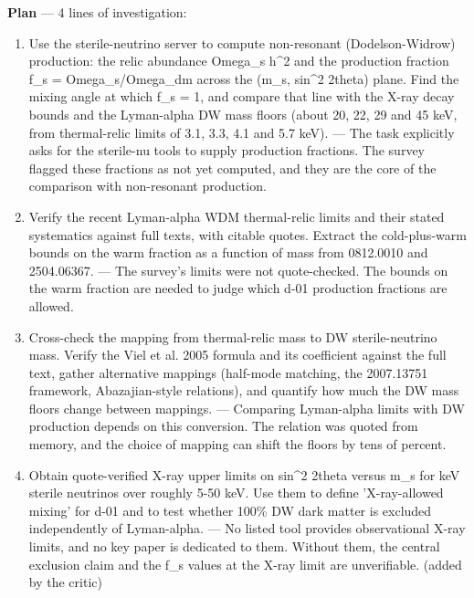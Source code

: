 \documentclass[11pt,a4paper]{article}
\begin{document}
\textbf{Plan} --- 4 lines of investigation:

\begin{enumerate}
  \item Use the sterile-neutrino server to compute non-resonant (Dodelson-Widrow) production: the relic abundance Omega\_s h\textasciicircum{}2 and the production fraction f\_s = Omega\_s/Omega\_dm across the (m\_s, sin\textasciicircum{}2 2theta) plane. Find the mixing angle at which f\_s = 1, and compare that line with the X-ray decay bounds and the Lyman-alpha DW mass floors (about 20, 22, 29 and 45 keV, from thermal-relic limits of 3.1, 3.3, 4.1 and 5.7 keV). --- The task explicitly asks for the sterile-nu tools to supply production fractions. The survey flagged these fractions as not yet computed, and they are the core of the comparison with non-resonant production.
  \item Verify the recent Lyman-alpha WDM thermal-relic limits and their stated systematics against full texts, with citable quotes. Extract the cold-plus-warm bounds on the warm fraction as a function of mass from 0812.0010 and 2504.06367. --- The survey's limits were not quote-checked. The bounds on the warm fraction are needed to judge which d-01 production fractions are allowed.
  \item Cross-check the mapping from thermal-relic mass to DW sterile-neutrino mass. Verify the Viel et al. 2005 formula and its coefficient against the full text, gather alternative mappings (half-mode matching, the 2007.13751 framework, Abazajian-style relations), and quantify how much the DW mass floors change between mappings. --- Comparing Lyman-alpha limits with DW production depends on this conversion. The relation was quoted from memory, and the choice of mapping can shift the floors by tens of percent.
  \item Obtain quote-verified X-ray upper limits on sin\textasciicircum{}2 2theta versus m\_s for keV sterile neutrinos over roughly 5-50 keV. Use them to define 'X-ray-allowed mixing' for d-01 and to test whether 100\% DW dark matter is excluded independently of Lyman-alpha. --- No listed tool provides observational X-ray limits, and no key paper is dedicated to them. Without them, the central exclusion claim and the f\_s values at the X-ray limit are unverifiable. (added by the critic)

\end{enumerate}
\end{document}
